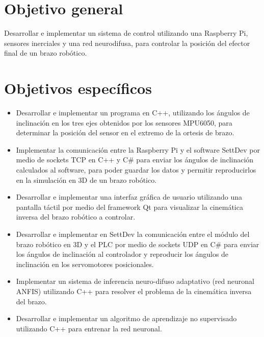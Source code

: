 \section{Objetivo general}

Desarrollar e implementar un sistema de control utilizando una Raspberry Pi, sensores inerciales y una red neurodifusa, para controlar la posición del efector final de un brazo robótico.

\newpage
\section{Objetivos específicos}
\begin{itemize}
	
	\item Desarrollar e implementar un programa en C++, utilizando los ángulos de inclinación en los tres ejes obtenidos por los sensores MPU6050, para determinar la posición del sensor en el extremo de la ortesis de brazo.
	
	\item Implementar la comunicación entre la Raspberry Pi y el software SettDev por medio de sockets TCP en C++ y C\# para enviar los ángulos de inclinación calculados al software, para poder guardar los datos y permitir reproducirlos en la simulación en 3D de un brazo robótico.
	
	\item Desarrollar e implementar una interfaz gráfica de usuario utilizando una pantalla táctil por medio del framework Qt para visualizar la cinemática inversa del brazo robótico a controlar.
	
	\item Desarrollar e implementar en SettDev la comunicación entre el módulo del brazo robótico en 3D y el PLC por medio de sockets UDP en C\# para enviar los ángulos de inclinación al controlador y reproducir los ángulos de inclinación en los servomotores posicionales.
	
	\item Implementar un sistema de inferencia neuro-difuso adaptativo (red neuronal ANFIS) utilizando C++ para resolver el problema de la cinemática inversa del brazo.
	
	\item Desarrollar e implementar un algoritmo de aprendizaje no supervisado utilizando C++ para entrenar la red neuronal.
	
\end{itemize}